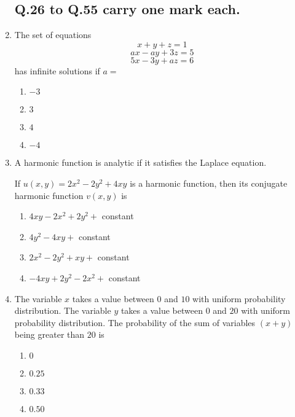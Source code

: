 \documentclass[journal]{IEEEtran}
\begin{document}
\begin{enumerate}
\subsection*{Q.26 to Q.55 carry one mark each.}

    \item The set of equations
        $$x+y+z=1$$
        $$ax-ay+3z=5$$
        $$5x-3y+az=6$$
        has infinite solutions if $a=$
        \begin{enumerate}
            \item $-3$
            \item $3$
            \item $4$
            \item $-4$
        \end{enumerate}

    \item A harmonic function is analytic if it satisfies the Laplace equation.

        If $u(x,y)=2x^2-2y^2+4xy$ is a harmonic function, then its conjugate harmonic function $v(x,y)$ is
        \begin{enumerate}
            \item $4xy-2x^2+2y^2+$ constant
            \item $4y^2-4xy+$ constant
            \item $2x^2-2y^2+xy+$ constant
            \item $-4xy+2y^2-2x^2+$ constant
        \end{enumerate}

    \item The variable $x$ takes a value between $0$ and $10$ with uniform probability distribution. The variable $y$ takes a value between $0$ and $20$ with uniform probability distribution. The probability of the sum of variables $(x + y)$ being greater than $20$ is
        \begin{enumerate}
            \item $0$
            \item $0.25$
            \item $0.33$
            \item $0.50$
        \end{enumerate}


\end{enumerate}
\end{document}
